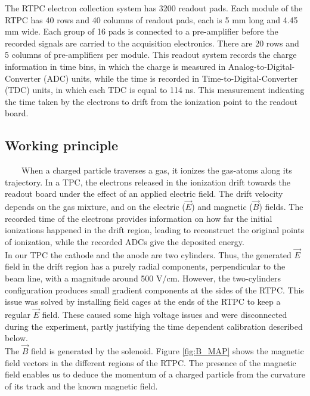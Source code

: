 The RTPC electron collection system has 3200 readout pads. Each module of the 
RTPC has 40 rows and 40 columns of readout pads, each is 5 mm long and 4.45 mm 
wide. Each group of 16 pads is connected to a pre-amplifier before the recorded 
signals are carried to the acquisition electronics. There are 20 rows and 5 
columns of pre-amplifiers per module. This readout system records the charge 
information in time bins, in which the charge is measured in 
Analog-to-Digital-Converter (ADC) units, while the time is recorded in 
Time-to-Digital-Converter (TDC) units, in which each TDC is equal to 114 ns.  
This measurement indicating the time taken by the electrons to drift from the 
ionization point to the readout board. 

 
\subsection{Working principle}
~~~~When a charged particle traverses a gas, it ionizes the gas-atoms along its 
trajectory. In a TPC, the electrons released in the ionization drift towards 
the readout board under the effect of an applied electric field. The drift 
velocity depends on the gas mixture, and on the electric ($\vec{E}$) and 
magnetic ($\vec{B}$) fields. The recorded time of the electrons provides 
information on how far the initial ionizations happened in the drift region, 
leading to reconstruct the original points of ionization, while the recorded 
ADCs give the deposited energy.\\

In our TPC the cathode and the anode are two cylinders. Thus, the generated 
$\vec{E}$ field in the drift region has a purely radial components, 
perpendicular to the beam line, with a magnitude around 500 V/cm. However, the 
two-cylinders configuration produces small gradient components at the sides of 
the RTPC. This issue was solved by installing field cages at the ends of the 
RTPC to keep a regular $\vec{E}$ field. These caused some high voltage issues 
and were disconnected during the experiment, partly justifying the time 
dependent calibration described below. \\

The $\vec{B}$ field is generated by the solenoid. Figure \ref{fig:B_MAP} shows 
the magnetic field vectors in the different regions of the RTPC. The presence 
of the magnetic field enables us to deduce the momentum of a charged particle 
from the curvature of its track and the known magnetic field.

